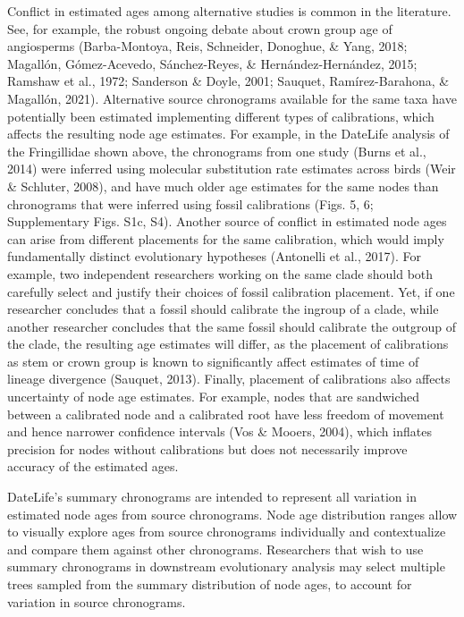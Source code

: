 \documentclass[english,man]{apa6}
\begin{document}
Conflict in estimated ages among alternative studies is common in the literature. See, for example, the robust ongoing debate about crown group age of angiosperms (Barba-Montoya, Reis, Schneider, Donoghue, \& Yang, 2018; Magallón, Gómez-Acevedo, Sánchez-Reyes, \& Hernández-Hernández, 2015; Ramshaw et al., 1972; Sanderson \& Doyle, 2001; Sauquet, Ramírez-Barahona, \& Magallón, 2021).
Alternative source chronograms available for the same taxa have potentially been estimated implementing different types of calibrations, which affects the resulting node age estimates.
For example, in the DateLife analysis of the Fringillidae shown above, the chronograms from one study (Burns et al., 2014) were inferred using molecular substitution rate estimates across birds (Weir \& Schluter, 2008), and have much older age estimates for the same nodes than chronograms that were inferred using fossil calibrations (Figs. 5, 6; Supplementary Figs. S1c, S4).
Another source of conflict in estimated node ages can arise from different placements for the same calibration, which would imply fundamentally distinct evolutionary hypotheses (Antonelli et al., 2017).
For example, two independent researchers working on the same clade should both carefully select and justify their choices of fossil calibration placement.
Yet, if one researcher concludes that a fossil should calibrate the ingroup of a clade, while another researcher concludes that the same fossil should calibrate the outgroup of the clade, the resulting age estimates will differ, as the placement of calibrations as stem or crown group is known to significantly affect estimates of time of lineage divergence (Sauquet, 2013).
Finally, placement of calibrations also affects uncertainty of node age estimates. For example, nodes that are sandwiched between a calibrated node and a calibrated root have less freedom of movement and hence narrower confidence intervals (Vos \& Mooers, 2004), which inflates precision for nodes without calibrations but does not necessarily improve accuracy of the estimated ages.

DateLife's summary chronograms are intended to represent all variation in estimated node ages from source chronograms. Node age distribution ranges allow to visually explore ages from source chronograms individually and contextualize and compare them against other chronograms. Researchers that wish to use summary chronograms in downstream evolutionary analysis may select multiple trees sampled from the summary distribution of node ages, to account for variation in source chronograms.
\end{document}
